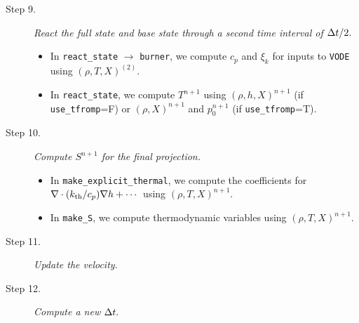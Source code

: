 \begin{description}
\begin{itemize}
\end{itemize}
\item[Step 9.] {\em React the full state and base state through a second time interval 
of $\Delta t/2.$}
\begin{itemize}
\item In {\tt react\_state} $\rightarrow$ {\tt burner}, we compute $c_p$ and $\xi_k$ 
for inputs to {\tt VODE} using $(\rho,T,X)^{(2)}$.
\item In {\tt react\_state}, we compute $T^{n+1}$ using $(\rho,h,X)^{n+1}$ 
(if {\tt use\_tfromp}=F) or $(\rho,X)^{n+1}$ and $p_0^{n+1}$ (if {\tt use\_tfromp}=T).
\end{itemize}
\item[Step 10.] {\em Compute $S^{n+1}$ for the final projection.}
\begin{itemize}
\item In {\tt make\_explicit\_thermal}, we compute the coefficients for 
$\nabla\cdot(k_{\rm th}/c_p)\nabla h + \cdots$ using $(\rho,T,X)^{n+1}$.
\item In {\tt make\_S}, we compute thermodynamic variables using $(\rho,T,X)^{n+1}$.
\end{itemize}
\item[Step 11.] {\em Update the velocity.}
\item[Step 12.] {\em Compute a new $\Delta t.$}
\end{description}
